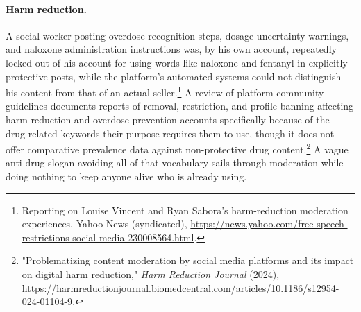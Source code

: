 \documentclass[11pt]{article}
\begin{document}
\paragraph{Harm reduction.} A social worker posting overdose-recognition steps, dosage-uncertainty warnings, and naloxone administration instructions was, by his own account, repeatedly locked out of his account for using words like naloxone and fentanyl in explicitly protective posts, while the platform's automated systems could not distinguish his content from that of an actual seller.\footnote{Reporting on Louise Vincent and Ryan Sabora's harm-reduction moderation experiences, Yahoo News (syndicated), \url{https://news.yahoo.com/free-speech-restrictions-social-media-230008564.html}.} A review of platform community guidelines documents reports of removal, restriction, and profile banning affecting harm-reduction and overdose-prevention accounts specifically because of the drug-related keywords their purpose requires them to use, though it does not offer comparative prevalence data against non-protective drug content.\footnote{"Problematizing content moderation by social media platforms and its impact on digital harm reduction," \emph{Harm Reduction Journal} (2024), \url{https://harmreductionjournal.biomedcentral.com/articles/10.1186/s12954-024-01104-9}.} A vague anti-drug slogan avoiding all of that vocabulary sails through moderation while doing nothing to keep anyone alive who is already using.
\end{document}
